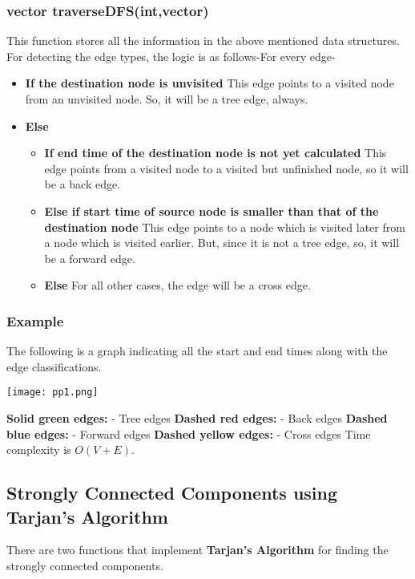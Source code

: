 \documentclass{article}
\begin{document}
\subsubsection{vector traverseDFS(int,vector)}
This function stores all the information in the above mentioned data structures. For detecting the edge types, the logic is as follows-\newline For every edge-
\begin{itemize}
	\item \textbf{If the destination node is unvisited}\newline
	This edge points to a visited node from an unvisited node. So, it will be a tree edge, always.
	\item \textbf{Else}
	\begin{itemize}
		\item \textbf{If end time of the destination node is not yet calculated}\newline
		This edge points from a visited node to a visited but unfinished node, so it will be a back edge.
		\item \textbf{Else if start time of source node is smaller than that of the destination node}\newline
		This edge points to a node which is visited later from a node which is visited earlier. But, since it is not a tree edge, so, it will be a forward edge.
		\item \textbf{Else}\newline
		For all other cases, the edge will be a cross edge.
	\end{itemize}
\end{itemize}
\subsubsection{Example}
The following is a graph indicating all the start and end times along with the edge classifications.
\begin{center}
\texttt{[image: pp1.png]}
\end{center}
\textbf{Solid green edges:} - Tree edges\newline
\textbf{Dashed red edges:} - Back edges\newline
\textbf{Dashed blue edges:} - Forward edges\newline
\textbf{Dashed yellow edges:} - Cross edges\newline
Time complexity is $O(V+E)$.

\subsection{Strongly Connected Components using Tarjan's Algorithm}
There are two functions that implement \textbf{Tarjan's Algorithm} for finding the strongly connected components.
\end{document}
